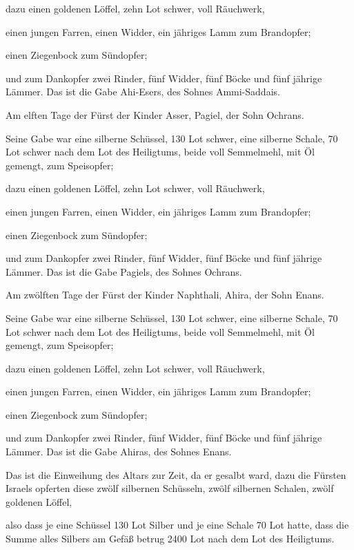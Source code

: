  dazu einen goldenen Löffel, zehn Lot schwer, voll
Räuchwerk,

 einen jungen Farren, einen Widder, ein jähriges Lamm zum
Brandopfer;

 einen Ziegenbock zum Sündopfer;

 und zum Dankopfer zwei Rinder, fünf Widder, fünf Böcke
und fünf jährige Lämmer. Das ist die Gabe Ahi-Esers, des Sohnes
Ammi-Saddais.

 Am elften Tage der Fürst der Kinder Asser, Pagiel, der
Sohn Ochrans.

 Seine Gabe war eine silberne Schüssel, 130 Lot schwer,
eine silberne Schale, 70 Lot schwer nach dem Lot des Heiligtums, beide
voll Semmelmehl, mit Öl gemengt, zum Speisopfer;

 dazu einen goldenen Löffel, zehn Lot schwer, voll
Räuchwerk,

 einen jungen Farren, einen Widder, ein jähriges Lamm zum
Brandopfer;

 einen Ziegenbock zum Sündopfer;

 und zum Dankopfer zwei Rinder, fünf Widder, fünf Böcke
und fünf jährige Lämmer. Das ist die Gabe Pagiels, des Sohnes Ochrans.

 Am zwölften Tage der Fürst der Kinder Naphthali, Ahira,
der Sohn Enans.

 Seine Gabe war eine silberne Schüssel, 130 Lot schwer,
eine silberne Schale, 70 Lot schwer nach dem Lot des Heiligtums, beide
voll Semmelmehl, mit Öl gemengt, zum Speisopfer;

 dazu einen goldenen Löffel, zehn Lot schwer, voll
Räuchwerk,

 einen jungen Farren, einen Widder, ein jähriges Lamm zum
Brandopfer;

 einen Ziegenbock zum Sündopfer;

 und zum Dankopfer zwei Rinder, fünf Widder, fünf Böcke
und fünf jährige Lämmer. Das ist die Gabe Ahiras, des Sohnes Enans.

 Das ist die Einweihung des Altars zur Zeit, da er
gesalbt ward, dazu die Fürsten Israels opferten diese zwölf silbernen
Schüsseln, zwölf silbernen Schalen, zwölf goldenen Löffel,

 also dass je eine Schüssel 130 Lot Silber und je eine
Schale 70 Lot hatte, dass die Summe alles Silbers am Gefäß betrug 2400
Lot nach dem Lot des Heiligtums.

